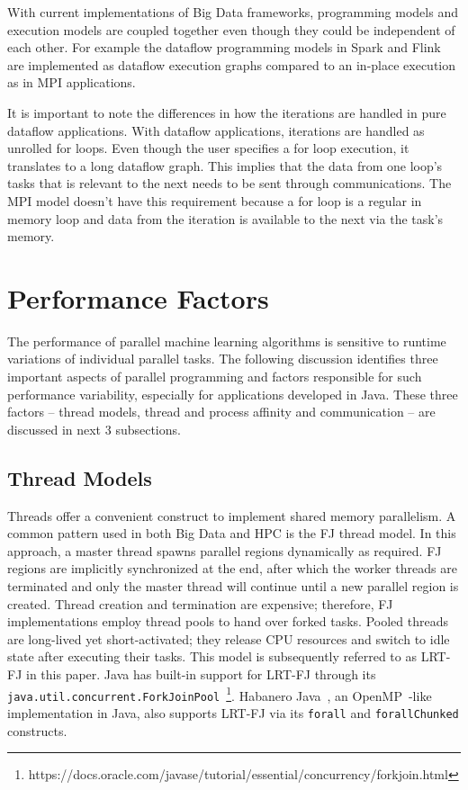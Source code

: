 \documentclass[10pt, conference, compsocconf]{IEEEtran}
\begin{document}
With current implementations of Big Data frameworks, programming models and execution models are coupled together even though they could be independent of each other. For example the  dataflow programming models in Spark and Flink are implemented as  dataflow execution graphs compared to an in-place execution as in \ac{MPI} applications.

It is important to note the differences in how the iterations are handled in pure  dataflow applications. With  dataflow applications, iterations are handled as unrolled for loops. Even though the user specifies a for loop execution, it translates to a long dataflow graph. This implies that the data from one loop's tasks that is relevant to the next needs to be sent through communications. The \ac{MPI} model doesn't have this requirement because a for loop is a regular in memory loop  and data from the iteration is available to the next via the task's memory. 

\section{Performance Factors} \label{sec:factors}

The performance of parallel machine learning algorithms is sensitive to runtime variations of individual parallel tasks. The following discussion identifies three important aspects of parallel programming and factors responsible for such performance variability, especially for applications developed in Java. These three factors -- thread models, thread and process affinity and communication -- are discussed in next 3 subsections.

\subsection{Thread Models}
Threads offer a convenient construct to implement shared memory parallelism. A common pattern used in both Big Data and \ac{HPC} is the \ac{FJ} thread model. In this approach, a master thread spawns parallel regions dynamically as required. \ac{FJ} regions are implicitly synchronized at the end, after which the worker threads are terminated and only the master thread will continue until a new parallel region is created. Thread creation and termination are expensive; therefore, \ac{FJ} implementations employ thread pools to hand over forked tasks. Pooled threads are long-lived yet short-activated; they release \acs{CPU} resources and switch to idle state after executing their tasks. This model is subsequently referred to as \ac{LRT-FJ} in this paper. Java has built-in support for \ac{LRT-FJ} through its \texttt{java.util.concurrent.ForkJoinPool}~\footnote{https://docs.oracle.com/javase/tutorial/essential/concurrency/forkjoin.html}. Habanero Java~\cite{Imam:2014:HLJ:2647508.2647514}, an OpenMP~\cite{Dagum:1998:OIA:615255.615542}-like implementation in Java, also supports \ac{LRT-FJ} via its \texttt{forall} and \texttt{forallChunked} constructs.
\end{document}
